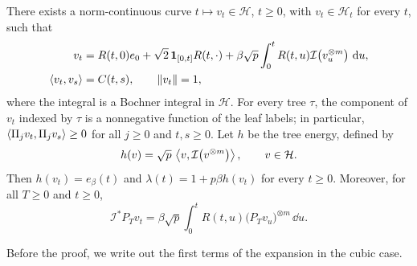 \begin{proposition}
\label{prop:geometry-tree-realization}
There exists a norm-continuous curve $t\mapsto v_t\in\mathcal H$, $t\ge0$, with $v_t\in\mathcal H_t$ for every $t$, such that
\begin{align}
 v_t={}&R(t,0)e_0+\sqrt2\,\mathbf 1_{[0,t]}R(t,\cdot)
       +\beta\sqrt p\int_0^tR(t,u)\mathcal I\bigl(v_u^{\otimes m}\bigr)\,\mathop{}\!\mathrm d u,
       \label{eq:geometry-tree-realization}\\
 \left\langle v_t,v_s\right\rangle={}&C(t,s),\qquad \lVert v_t\rVert=1,
       \label{eq:geometry-tree-gram}
\end{align}
where the integral is a Bochner integral in $\mathcal H$. For every tree $\tau$, the component of $v_t$ indexed by $\tau$ is a nonnegative function of the leaf labels; in particular, $\left\langle\Pi_jv_t,\Pi_jv_s\right\rangle\ge0$ for all $j\ge0$ and $t,s\ge0$. Let $h$ be the tree energy, defined by
\begin{equation}
 h(v)=\sqrt p\,\left\langle v,\mathcal I\bigl(v^{\otimes m}\bigr)\right\rangle,\qquad v\in\mathcal H.
 \label{eq:geometry-tree-energy}
\end{equation}
Then $h(v_t)=e_\beta(t)$ and $\lambda(t)=1+p\beta h(v_t)$ for every $t\ge0$. Moreover, for all $T\ge0$ and $t\ge0$,
\begin{equation}
 \mathcal I^*P_Tv_t
 =\beta\sqrt p\int_0^tR(t,u)\bigl(P_Tv_u\bigr)^{\otimes m}\,\dd u.
 \label{eq:geometry-prefix-root-frame}
\end{equation}
\end{proposition}

Before the proof, we write out the first terms of the expansion in the cubic case.

